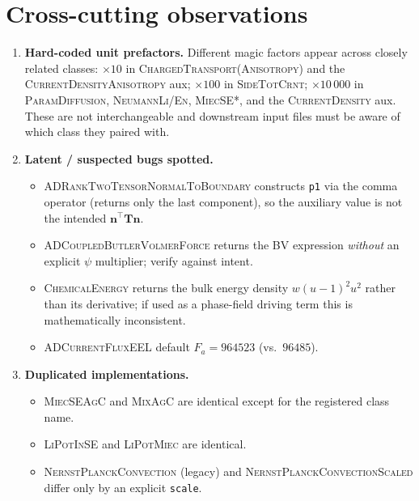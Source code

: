 \documentclass[11pt]{article}
\newcommand{\F}{F_{\!a}}            %
\newcommand{\nvec}{\mathbf{n}}
\begin{document}
\section*{Cross-cutting observations}

\begin{enumerate}
  \item \textbf{Hard-coded unit prefactors.} Different magic factors appear across closely
    related classes: $\times 10$ in \textsc{ChargedTransport(Anisotropy)} and the
    \textsc{CurrentDensityAnisotropy} aux; $\times 100$ in \textsc{SideTotCrnt};
    $\times 10\,000$ in \textsc{ParamDiffusion}, \textsc{NeumannLi/En}, \textsc{MiecSE*},
    and the \textsc{CurrentDensity} aux. These are not interchangeable and downstream input
    files must be aware of which class they paired with.
  \item \textbf{Latent / suspected bugs spotted.}
    \begin{itemize}
      \item \textsc{ADRankTwoTensorNormalToBoundary} constructs \texttt{p1} via the comma
        operator (returns only the last component), so the auxiliary value is not the
        intended $\nvec^{\!\top}\bm{T}\nvec$.
      \item \textsc{ADCoupledButlerVolmerForce} returns the BV expression \emph{without}
        an explicit $\psi$ multiplier; verify against intent.
      \item \textsc{ChemicalEnergy} returns the bulk energy density $w(u-1)^2 u^2$ rather
        than its derivative; if used as a phase-field driving term this is
        mathematically inconsistent.
      \item \textsc{ADCurrentFluxEEL} default $\F=964523$ (vs.\ $96485$).
    \end{itemize}
  \item \textbf{Duplicated implementations.}
    \begin{itemize}
      \item \textsc{MiecSEAgC} and \textsc{MixAgC} are identical except for the registered
        class name.
      \item \textsc{LiPotInSE} and \textsc{LiPotMiec} are identical.
      \item \textsc{NernstPlanckConvection} (legacy) and \textsc{NernstPlanckConvectionScaled}
        differ only by an explicit \texttt{scale}.

\end{itemize}
\end{enumerate}
\end{document}
